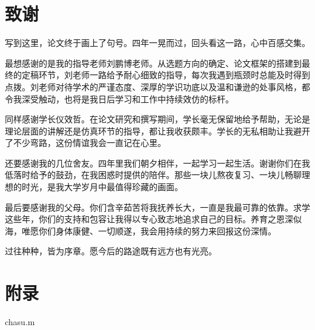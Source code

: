 



\chapter*{\sanhao\heiti\textbf{致\qquad 谢}}

写到这里，论文终于画上了句号。四年一晃而过，回头看这一路，心中百感交集。

最想感谢的是我的指导老师刘鹏博老师。从选题方向的确定、论文框架的搭建到最终的定稿环节，刘老师一路给予耐心细致的指导，每次我遇到瓶颈时总能及时得到点拨。刘老师对待学术的严谨态度、深厚的学识功底以及温和谦逊的处事风格，都令我深受触动，也将是我日后学习和工作中持续效仿的标杆。

同样感谢学长仪效哲。在论文研究和撰写期间，学长毫无保留地给予帮助，无论是理论层面的讲解还是仿真环节的指导，都让我收获颇丰。学长的无私相助让我避开了不少弯路，这份情谊我会一直记在心里。

还要感谢我的几位舍友。四年里我们朝夕相伴，一起学习一起生活。谢谢你们在我低落时给予的鼓劲，在我困惑时提供的陪伴。那些一块儿熬夜复习、一块儿畅聊理想的时光，是我大学岁月中最值得珍藏的画面。

最后要感谢我的父母。你们含辛茹苦将我抚养长大，一直是我最可靠的依靠。求学这些年，你们的支持和包容让我得以专心致志地追求自己的目标。养育之恩深似海，唯愿你们身体康健、一切顺遂，我会用持续的努力来回报这份深情。

过往种种，皆为序章。愿今后的路途既有远方也有光亮。




\chapter*{\sanhao\heiti\textbf{附\qquad 录}}

chasu.m




